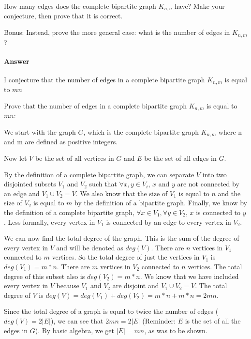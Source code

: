 \documentclass{article}
\begin{document}
 

How many edges does the complete bipartite graph $K_{n,n}$ have?  Make your
conjecture, then prove that it is correct.

Bonus: Instead, prove the more general case:
what is the number of edges in $K_{n,m}$?

\paragraph{Answer}

I conjecture that the number of edges in a complete bipartite graph $K_{n,m}$ is equal to $mn$

Prove that the number of edges in a complete bipartite graph $K_{n,m}$ is equal to $mn$:

We start with the graph $G$, which is the complete bipartite graph $K_{n,m}$ where n and m are defined as positive integers.

Now let $V$ be the set of all vertices in $G$ and $E$ be the set of all edges in $G$.

By the definition of a complete bipartite graph, we can separate $V$ into two disjointed subsets $V_1$ and $V_2$ such that $\forall x, y \in V_i$, $x$ and $y$ are not connected by an edge and $V_1 \cup V_2 = V$. We also know that the size of $V_1$ is equal to $n$ and the size of $V_2$ is equal to $m$ by the definition of a bipartite graph. Finally, we know by the definition of a complete bipartite graph, $\forall x \in V_1, \forall y \in V_2$, $x$ is connected to $y$. Less formally, every vertex in $V_1$ is connected by an edge to every vertex in $V_2$.

We can now find the total degree of the graph. This is the sum of the degree of every vertex in $V$ and will be denoted as $deg(V)$. There are $n$ vertices in $V_1$ connected to $m$ vertices. So the total degree of just the vertices in $V_1$ is $deg(V_1) = m*n$. There are $m$ vertices in $V_2$ connected to $n$ vertices. The total degree of this subset also is $deg(V_2) = m*n$. We know that we have included every vertex in $V$ because $V_1$ and $V_2$ are disjoint and $V_1 \cup V_2 = V$. The total degree of $V$ is $deg(V) = deg(V_1) + deg(V_2) = m*n + m*n = 2mn$.

 Since the total degree of a graph is equal to twice the number of edges ($deg(V) = 2 |E|$), we can see that $2mn = 2|E|$ (Reminder: $E$ is the set of all the edges in $G$). By basic algebra, we get $|E| = mn$, as was to be shown.
\end{document}

